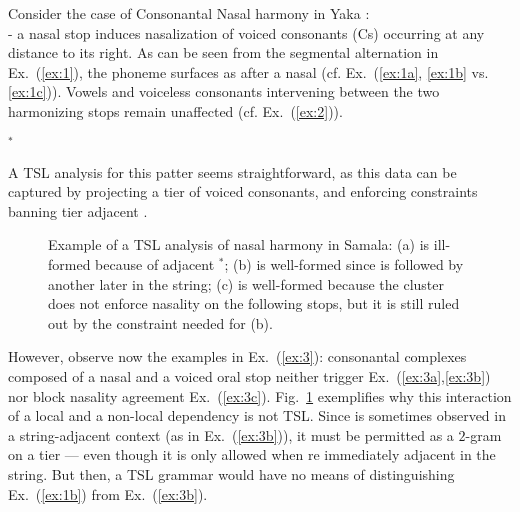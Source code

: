 Consider the case of Consonantal Nasal harmony in Yaka  \cite{Walker_Yaka}: \\- a nasal stop induces nasalization of voiced consonants (Cs) occurring at any distance to its right.
As can be seen from the  segmental alternation in  Ex.~(\ref{ex:1}),  the phoneme  surfaces as  \textipa{[n]} after a nasal  (cf.  Ex.~(\ref{ex:1a}, \ref{ex:1b} vs.  \ref{ex:1c})).
Vowels and voiceless consonants intervening between the two harmonizing stops remain unaffected  (cf. Ex.~(\ref{ex:2})).


\begin{exe}
    \ex\label{ex:1}\begin{xlist}
    	 \ex\label{ex:1a}    
	 \ex\label{ex:1b} 
	 \ex\label{ex:1c} $^*$      
	\end{xlist}
    \ex\label{ex:2}\begin{xlist}
     	\ex\label{ex:2a} 
    	\ex\label{ex:2b}
    \end{xlist}
     \ex\label{ex:3}\begin{xlist}
    	 \ex\label{ex:3a}    
	 \ex\label{ex:3b}  
	 \ex\label{ex:3c}  
	\end{xlist}
\end{exe}

A TSL analysis for this patter seems straightforward, as this data can be captured by projecting a tier of voiced consonants, and enforcing constraints banning tier adjacent  \textipa{[nd]}.

\begin{figure}[t]
\centering
       \hspace{2cm}
        
        \caption{Example of a TSL analysis of nasal harmony in Samala: (a) is ill-formed because of adjacent $^*$\textipa{[nd]}; (b) is well-formed since  \textipa{[n]} is followed by another  \textipa{[n]} later in the string; (c) is well-formed because the \textipa{[nd]} cluster does not enforce nasality on the following stops, but it is still ruled out by the constraint needed for (b). }
        \label{fig:YAKA1}
        \end{figure}



However, observe now the examples in  Ex.~(\ref{ex:3}): consonantal complexes composed of a nasal and a voiced oral stop neither trigger   Ex.~(\ref{ex:3a},\ref{ex:3b}) nor block nasality agreement   Ex.~(\ref{ex:3c}).
Fig.~\ref{fig:YAKA1} exemplifies why this interaction of a local and a non-local dependency is not TSL\@. 
Since \textipa{[nd]} is sometimes observed in a string-adjacent context (as in Ex.~(\ref{ex:3b})), it must be permitted as a $2$-gram on a tier --- even though it is only allowed when  \textipa{[nd]} re immediately adjacent in the string.
But then,  a TSL grammar would have no means of distinguishing Ex.~(\ref{ex:1b}) from Ex.~(\ref{ex:3b}).

